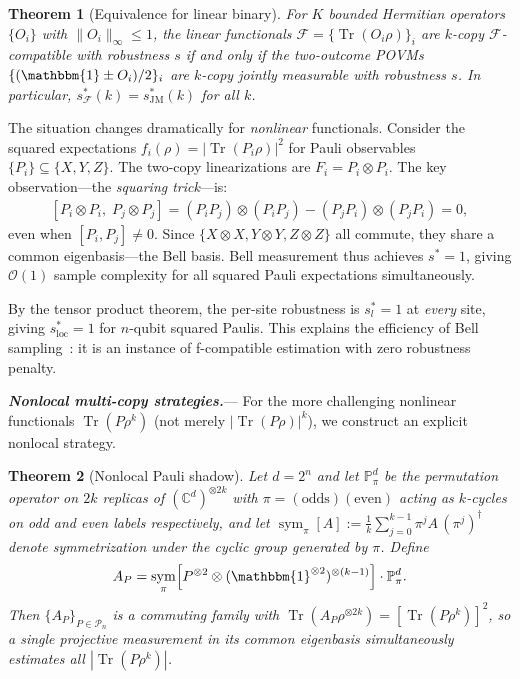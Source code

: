 \documentclass[aps,%
twocolumn,%
floatfix,%
pra,%
amsfonts,%
groupedaddress,%
superscriptaddress]{revtex4-2}%
\newtheorem{theorem}{Theorem}
\DeclareMathOperator{\tr}{Tr}
\newcommand{\ox}{\otimes}
\newcommand{\1}{\mathbbm{1}}
\newcommand*{\cF}{\mathcal{F}}
\newcommand*{\cP}{\mathcal{P}}
\newcommand*{\bP}{\mathbb{P}}
\DeclareMathOperator{\sym}{sym}
\newcommand\prlsection[1]{\textit{\textbf{#1}}---}
\begin{document}
\begin{theorem}[Equivalence for linear binary]\label{thm:linear-equiv}
For $K$ bounded Hermitian operators $\{O_i\}$ with $\|O_i\|_\infty \leq 1$, the linear functionals $\cF = \{\tr(O_i\rho)\}_i$ are $k$-copy $\cF$-compatible with robustness $s$ if and only if the two-outcome POVMs $\{(\1 \pm O_i)/2\}_i$ are $k$-copy jointly measurable with robustness $s$. In particular, $s^*_\cF(k) = s^*_{\mathrm{JM}}(k)$ for all $k$.
\end{theorem}

The situation changes dramatically for \emph{nonlinear} functionals. Consider the squared expectations $f_i(\rho) = |\tr(P_i\rho)|^2$ for Pauli observables $\{P_i\} \subseteq \{X,Y,Z\}$. The two-copy linearizations are $F_i = P_i \ox P_i$. The key observation---the \emph{squaring trick}---is:
\begin{align}\label{eq:squaring}
[P_i\ox P_i,\; P_j\ox P_j] = (P_iP_j)\ox(P_iP_j) - (P_jP_i)\ox(P_jP_i) = 0,
\end{align}
even when $[P_i, P_j] \neq 0$. Since $\{X\ox X, Y\ox Y, Z\ox Z\}$ all commute, they share a common eigenbasis---the Bell basis. Bell measurement thus achieves $s^* = 1$, giving $\mathcal{O}(1)$ sample complexity for all squared Pauli expectations simultaneously.

By the tensor product theorem, the per-site robustness is $s^*_l = 1$ at \emph{every} site, giving $s^*_{\mathrm{loc}} = 1$ for $n$-qubit squared Paulis. This explains the efficiency of Bell sampling~\cite{hangleiter2024bell}: it is an instance of f-compatible estimation with zero robustness penalty.



\prlsection{Nonlocal multi-copy strategies.}\label{sec:nonlocal}
For the more challenging nonlinear functionals $\tr(P\rho^k)$ (not merely $|\tr(P\rho)|^k$), we construct an explicit nonlocal strategy.

\begin{theorem}[Nonlocal Pauli shadow]\label{thm:nonlocal}
Let $d = 2^n$ and let $\bP^d_\pi$ be the permutation operator on $2k$ replicas of $(\mathbb{C}^d)^{\ox 2k}$ with $\pi = (\mathrm{odds})(\mathrm{even})$ acting as $k$-cycles on odd and even labels respectively, and let $\sym_\pi[A] := \frac{1}{k}\sum_{j=0}^{k-1} \pi^j A\, (\pi^{j})^\dagger$ denote symmetrization under the cyclic group generated by $\pi$. Define
\begin{align}\label{eq:AP}
A_P = \sym_\pi\!\left[P^{\ox 2}\ox(\1^{\ox 2})^{\ox(k-1)}\right]\cdot\bP^d_\pi.
\end{align}
Then $\{A_P\}_{P\in\cP_n}$ is a commuting family with $\tr(A_P\rho^{\ox 2k}) = [\tr(P\rho^k)]^2$, so a single projective measurement in its common eigenbasis simultaneously estimates all $|\tr(P\rho^k)|$.
\end{theorem}
\end{document}
